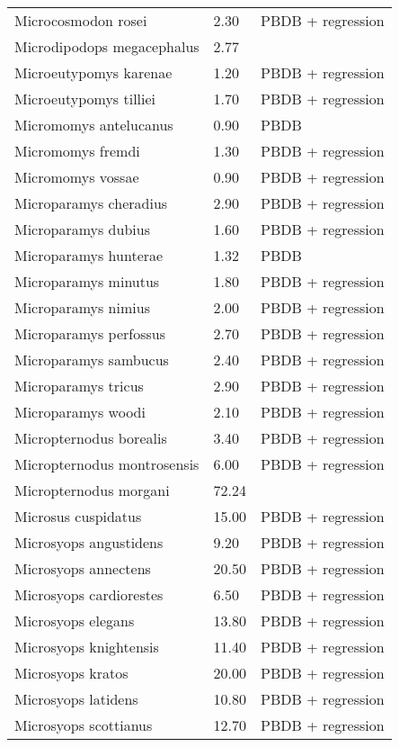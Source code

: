 \begin{longtable}{p{} p{} p{}}
    Microcosmodon rosei & 2.30 & PBDB + regression \\ 
    Microdipodops megacephalus & 2.77 & \cite{Smith2004} \\ 
    Microeutypomys karenae & 1.20 & PBDB + regression \\ 
    Microeutypomys tilliei & 1.70 & PBDB + regression \\ 
    Micromomys antelucanus & 0.90 & PBDB \\ 
    Micromomys fremdi & 1.30 & PBDB + regression \\ 
    Micromomys vossae & 0.90 & PBDB + regression \\ 
    Microparamys cheradius & 2.90 & PBDB + regression \\ 
    Microparamys dubius & 1.60 & PBDB + regression \\ 
    Microparamys hunterae & 1.32 & PBDB \\ 
    Microparamys minutus & 1.80 & PBDB + regression \\ 
    Microparamys nimius & 2.00 & PBDB + regression \\ 
    Microparamys perfossus & 2.70 & PBDB + regression \\ 
    Microparamys sambucus & 2.40 & PBDB + regression \\ 
    Microparamys tricus & 2.90 & PBDB + regression \\ 
    Microparamys woodi & 2.10 & PBDB + regression \\ 
    Micropternodus borealis & 3.40 & PBDB + regression \\ 
    Micropternodus montrosensis & 6.00 & PBDB + regression \\ 
    Micropternodus morgani & 72.24 & \cite{Tomiya2013} \\ 
    Microsus cuspidatus & 15.00 & PBDB + regression \\ 
    Microsyops angustidens & 9.20 & PBDB + regression \\ 
    Microsyops annectens & 20.50 & PBDB + regression \\ 
    Microsyops cardiorestes & 6.50 & PBDB + regression \\ 
    Microsyops elegans & 13.80 & PBDB + regression \\ 
    Microsyops knightensis & 11.40 & PBDB + regression \\ 
    Microsyops kratos & 20.00 & PBDB + regression \\ 
    Microsyops latidens & 10.80 & PBDB + regression \\ 
    Microsyops scottianus & 12.70 & PBDB + regression \\ 

\end{longtable}
